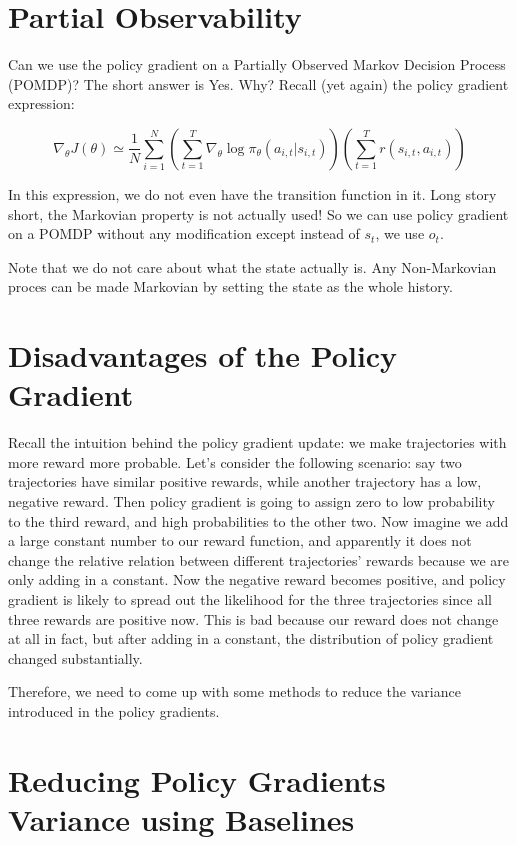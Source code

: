 \section{Partial Observability}
Can we use the policy gradient on a Partially Observed Markov Decision Process (POMDP)? The short answer is Yes. Why? Recall (yet again) the policy gradient expression:

$$\nabla_\theta J(\theta) \simeq \frac{1}{N}\sum_{i=1}^N\left(\sum_{t=1}^T\nabla_\theta \log\pi_\theta(a_{i,t}|s_{i,t})\right)\left(\sum_{t=1}^T r(s_{i,t},a_{i,t})\right)$$

In this expression, we do not even have the transition function in it. Long story short, the Markovian property is not actually used! So we can use policy gradient on a POMDP without any modification except instead of $s_t$, we use $o_t$.

Note that we do not care about what the state actually is. Any Non-Markovian proces can be made Markovian by setting the state as the whole history. 

\section{Disadvantages of the Policy Gradient}
Recall the intuition behind the policy gradient update: we make trajectories with more reward more probable. Let's consider the following scenario: say two trajectories have similar positive rewards, while another trajectory has a low, negative reward. Then policy gradient is going to assign zero to low probability to the third reward, and high probabilities to the other two. Now imagine we add a large constant number to our reward function, and apparently it does not change the relative relation between different trajectories' rewards because we are only adding in a constant. Now the negative reward becomes positive, and policy gradient is likely to spread out the likelihood for the three trajectories since all three rewards are positive now. This is bad because our reward does not change at all in fact, but after adding in a constant, the distribution of policy gradient changed substantially. 

Therefore, we need to come up with some methods to reduce the variance introduced in the policy gradients. 
\section{Reducing Policy Gradients Variance using Baselines}
